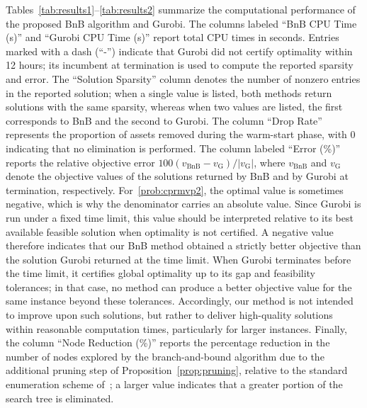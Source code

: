 \documentclass[11pt]{article}
\theoremstyle{plain}
\theoremstyle{definition}
\theoremstyle{plain}
\newcommand{\abs}[1]{\left\lvert#1\right\rvert}
\begin{document}
Tables~\ref{tab:results1}--\ref{tab:results2} summarize the computational performance of the proposed BnB algorithm and Gurobi. The columns labeled ``BnB CPU Time (s)'' and ``Gurobi CPU Time (s)'' report total CPU times in seconds. Entries marked with a dash (``-'') indicate that Gurobi did not certify optimality within 12 hours; its incumbent at termination is used to compute the reported sparsity and error. The ``Solution Sparsity'' column denotes the number of nonzero entries in the reported solution; when a single value is listed, both methods return solutions with the same sparsity, whereas when two values are listed, the first corresponds to BnB and the second to Gurobi. The column ``Drop Rate'' represents the proportion of assets removed during the warm-start phase, with 0 indicating that no elimination is performed. The column labeled ``Error (\%)'' reports the relative objective error $100(v_{\mathrm{BnB}}-v_{\mathrm{G}})/\abs{v_{\mathrm{G}}}$, where $v_{\mathrm{BnB}}$ and $v_{\mathrm{G}}$ denote the objective values of the solutions returned by BnB and by Gurobi at termination, respectively. For~\eqref{prob:cprmvp2}, the optimal value is sometimes negative, which is why the denominator carries an absolute value. Since Gurobi is run under a fixed time limit, this value should be interpreted relative to its best available feasible solution when optimality is not certified. A negative value therefore indicates that our BnB method obtained a strictly better objective than the solution Gurobi returned at the time limit. When Gurobi terminates before the time limit, it certifies global optimality up to its gap and feasibility tolerances; in that case, no method can produce a better objective value for the same instance beyond these tolerances. Accordingly, our method is not intended to improve upon such solutions, but rather to deliver high-quality solutions within reasonable computation times, particularly for larger instances. Finally, the column ``Node Reduction (\%)'' reports the percentage reduction in the number of nodes explored by the branch-and-bound algorithm due to the additional pruning step of Proposition~\ref{prop:pruning}, relative to the standard enumeration scheme of~\cite{SenAkkayaPinar2025}; a larger value indicates that a greater portion of the search tree is eliminated.
\end{document}
